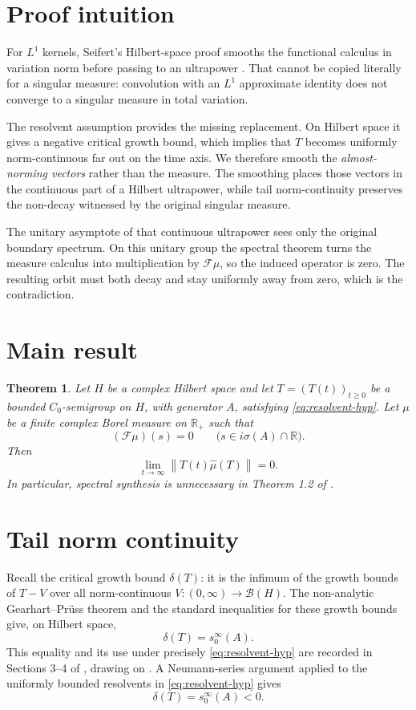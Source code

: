 \documentclass[11pt]{article}
\newtheorem{theorem}{Theorem}
\newcommand{\R}{\mathbb R}
\newcommand{\B}{\mathcal B}
\newcommand{\norm}[1]{\left\lVert#1\right\rVert}
\begin{document}
\section{Proof intuition}

For \(L^1\) kernels, Seifert's Hilbert-space proof smooths the functional
calculus in variation norm before passing to an ultrapower
\cite{SeifertHilbert}. That cannot be copied literally for a singular
measure: convolution with an \(L^1\) approximate identity does not converge
to a singular measure in total variation.

The resolvent assumption provides the missing replacement. On Hilbert space
it gives a negative critical growth bound, which implies that \(T\) becomes
uniformly norm-continuous far out on the time axis. We therefore smooth the
\emph{almost-norming vectors} rather than the measure. The smoothing places
those vectors in the continuous part of a Hilbert ultrapower, while tail
norm-continuity preserves the non-decay witnessed by the original singular
measure.

The unitary asymptote of that continuous ultrapower sees only the original
boundary spectrum. On this unitary group the spectral theorem turns the
measure calculus into multiplication by \(\mathcal F\mu\), so the induced
operator is zero. The resulting orbit must both decay and stay uniformly
away from zero, which is the contradiction.

\section{Main result}

\begin{theorem}\label{thm:main}
Let \(H\) be a complex Hilbert space and let \(T=(T(t))_{t\ge0}\) be a
bounded \(C_0\)-semigroup on \(H\), with generator \(A\), satisfying
\eqref{eq:resolvent-hyp}. Let \(\mu\) be a finite complex Borel measure on
\(\R_+\) such that
\[
 (\mathcal F\mu)(s)=0
 \qquad\bigl(s\in i\sigma(A)\cap\R\bigr).
\]
Then
\[
 \lim_{t\to\infty}\norm{T(t)\widehat\mu(T)}=0.
\]
In particular, spectral synthesis is unnecessary in Theorem 1.2 of
\cite{SeifertMeasures}.
\end{theorem}

\section{Tail norm continuity}

Recall the critical growth bound \(\delta(T)\): it is the infimum of the
growth bounds of \(T-V\) over all norm-continuous
\(V:(0,\infty)\to\B(H)\). The non-analytic Gearhart--Pr\"uss theorem and the
standard inequalities for these growth bounds give, on Hilbert space,
\[
 \delta(T)=s_0^\infty(A).
\]
This equality and its use under precisely \eqref{eq:resolvent-hyp} are
recorded in Sections 3--4 of \cite{SeifertMeasures}, drawing on
\cite{BBS,BS}. A Neumann-series argument applied to the uniformly bounded
resolvents in \eqref{eq:resolvent-hyp} gives
\begin{equation}\label{eq:delta-neg}
 \delta(T)=s_0^\infty(A)<0.
\end{equation}
\end{document}
